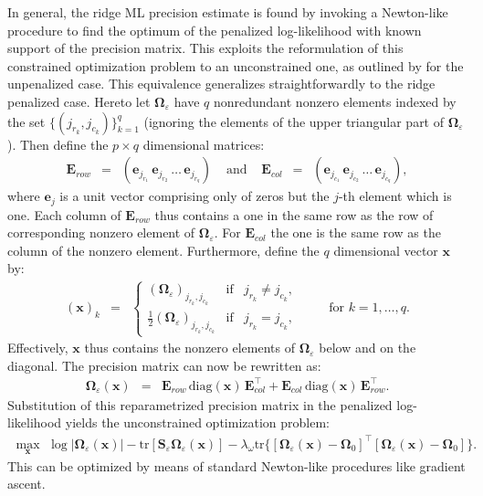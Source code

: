 In general, the ridge ML precision estimate is found by invoking a Newton-like procedure to find the optimum of the penalized log-likelihood with known support of the precision matrix. This exploits the reformulation of this constrained optimization problem to an unconstrained one, as outlined by \cite{Dahl2005} for the unpenalized case. This equivalence generalizes straightforwardly to the ridge penalized case. Hereto let $\mathbf{\Omega}_{\varepsilon}$ have $q$ nonredundant nonzero elements indexed by the set $\{(j_{r_k}, j_{c_k})\}_{k=1}^q$ (ignoring the elements of the upper triangular part of $\mathbf{\Omega}_{\varepsilon}$). Then define the $p \times q$ dimensional matrices:
\begin{eqnarray*}
\mathbf{E}_{row} \, \, \, = \, \, \, ( \mathbf{e}_{j_{r_1}} \, \mathbf{e}_{j_{r_2}} \, \ldots \, \mathbf{e}_{j_{r_q}}) & \mbox{ and }
& \mathbf{E}_{col} \, \, \, = \, \, \, ( \mathbf{e}_{j_{c_1}} \, \mathbf{e}_{j_{c_2}} \, \ldots \, \mathbf{e}_{j_{c_q}}),
\end{eqnarray*}
where $\mathbf{e}_j$ is a unit vector comprising only of zeros but the $j$-th element which is one. Each column of $\mathbf{E}_{row}$ thus contains a one in the same row as the row of corresponding nonzero element of $\mathbf{\Omega}_{\varepsilon}$. For $\mathbf{E}_{col}$ the one is the same row as the column of the nonzero element. Furthermore, define
the $q$ dimensional vector $\mathbf{x}$ by:
\begin{eqnarray*}
(\mathbf{x})_k & = &  \left\{
\begin{array}{rcl}
(\mathbf{\Omega}_{\varepsilon})_{j_{r_k}, j_{c_k}} & \mbox{if} & j_{r_k} \not= j_{c_k},
\\
\frac{1}{2} (\mathbf{\Omega}_{\varepsilon})_{j_{r_k}, j_{c_k}} & \mbox{if} & j_{r_k} = j_{c_k},
\end{array}
\right. \qquad \mbox{ for } k=1, \ldots, q.
\end{eqnarray*}
Effectively, $\mathbf{x}$ thus contains the nonzero elements of $\mathbf{\Omega}_{\varepsilon}$ below and on the diagonal. The precision matrix can now be rewritten as:
\begin{eqnarray*}
\mathbf{\Omega}_{\varepsilon}(\mathbf{x}) & = & \mathbf{E}_{row} \, \mbox{diag}(\mathbf{x}) \, \mathbf{E}_{col}^{\top} + \mathbf{E}_{col} \, \mbox{diag}(\mathbf{x}) \, \mathbf{E}_{row}^{\top}.
\end{eqnarray*}
Substitution of this reparametrized precision matrix in the penalized
log-likelihood yields the unconstrained optimization problem:
\begin{eqnarray*}
\max_{\mathbf{x}} \, \, \log| \mathbf{\Omega}_{\varepsilon}(\mathbf{x}) |   - \mbox{tr}  [ \mathbf{S}_{\varepsilon}  \mathbf{\Omega}_{\varepsilon}(\mathbf{x}) ] - \lambda_{\omega} \mbox{tr}  \{ [\mathbf{\Omega}_{\varepsilon}(\mathbf{x}) -\mathbf{\Omega}_0]^{\top} [\mathbf{\Omega}_{\varepsilon}(\mathbf{x}) - \mathbf{\Omega}_0] \}.
\end{eqnarray*}
This can be optimized by means of standard Newton-like procedures like gradient ascent.


